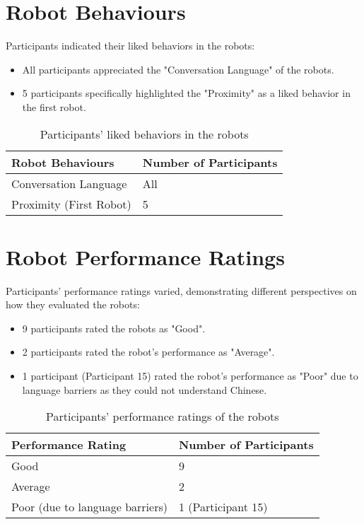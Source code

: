 \section{Robot Behaviours}

Participants indicated their liked behaviors in the robots:
\begin{itemize}
\item All participants appreciated the "Conversation Language" of the robots.
\item 5 participants specifically highlighted the "Proximity" as a liked behavior in the first robot.
\end{itemize}

\begin{table}[h]
\centering
\begin{tabular}{|l|l|}
\hline
\textbf{Robot Behaviours} & \textbf{Number of Participants} \\
\hline
Conversation Language & All \\
\hline
Proximity (First Robot) & 5 \\
\hline
\end{tabular}
\caption{Participants' liked behaviors in the robots}
\label{tab:robot_behaviours}
\end{table}

\section{Robot Performance Ratings}

Participants' performance ratings varied, demonstrating different perspectives on how they evaluated the robots:
\begin{itemize}
\item 9 participants rated the robots as "Good".
\item 2 participants rated the robot's performance as "Average".
\item 1 participant (Participant 15) rated the robot's performance as "Poor" due to language barriers as they could not understand Chinese.
\end{itemize}

\begin{table}[h]
\centering
\begin{tabular}{|l|l|}
\hline
\textbf{Performance Rating} & \textbf{Number of Participants} \\
\hline
Good & 9 \\
\hline
Average & 2 \\
\hline
Poor (due to language barriers) & 1 (Participant 15) \\
\hline
\end{tabular}
\vspace{1em}
\caption{Participants' performance ratings of the robots}
\label{tab:performance_ratings}
\end{table}

